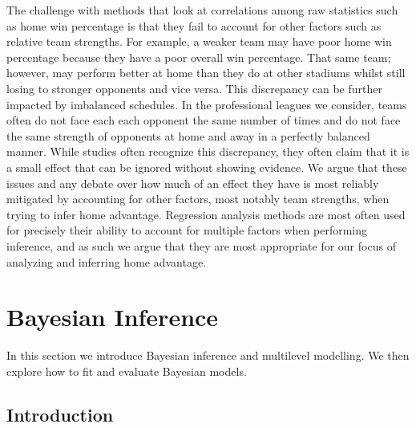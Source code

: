 The challenge with methods that look at correlations among raw statistics such as home win percentage is that they fail to account for other factors such as relative team strengths. For example, a weaker team may have poor home win percentage because they have a poor overall win percentage. That same team; however, may perform better at home than they do at other stadiums whilst still losing to stronger opponents and vice versa. This discrepancy can be further impacted by imbalanced schedules. In the professional leagues we consider, teams often do not face each each opponent the same number of times and do not face the same strength of opponents at home and away in a perfectly balanced manner. While studies often recognize this discrepancy, they often claim that it is a small effect that can be ignored \cite{Pollard2005a} without showing evidence. We argue that these issues and any debate over how much of an effect they have is most reliably mitigated by accounting for other factors, most notably team strengths, when trying to infer home advantage. Regression analysis methods are most often used for precisely their ability to account for multiple factors when performing inference, and as such we argue that they are most appropriate for our focus of analyzing and inferring home advantage.

\section{Bayesian Inference}

In this section we introduce Bayesian inference and multilevel modelling. We then explore how to fit and evaluate Bayesian models.

\subsection{Introduction}

